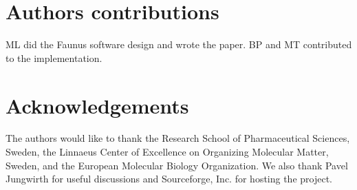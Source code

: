 \documentclass[10pt]{bmc_article}
\newenvironment{bmcformat}{\begin{raggedright}\baselineskip20pt\sloppy\setboolean{publ}{false}}{\end{raggedright}\baselineskip20pt\sloppy}
\begin{document}
\begin{bmcformat}
\section*{Authors contributions}
ML did the Faunus software design and wrote the paper.
BP and MT contributed to the implementation.

\section*{Acknowledgements}
  The authors would like to thank the Research School of Pharmaceutical Sciences, Sweden, the Linnaeus Center of Excellence on Organizing Molecular Matter, Sweden,
and the European Molecular Biology Organization.
We also thank Pavel Jungwirth for useful discussions and Sourceforge, Inc. for hosting the project.


{
   }     %





\end{bmcformat}
\end{document}
